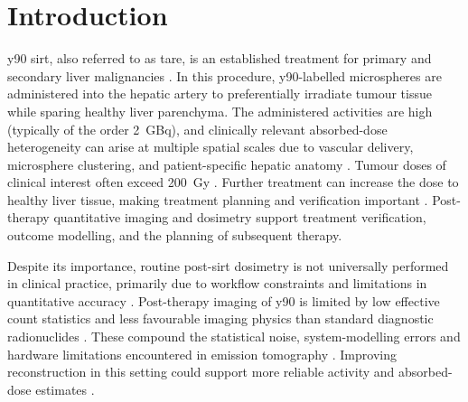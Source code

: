 \chapter{Introduction}
\label{ch:introduction}

\acrfull{y90} \acrfull{sirt}, also referred to as \acrfull{tare}, is an established treatment for primary and secondary liver malignancies \cite{sundramSelectiveInternalRadiation2017}. In this procedure, \gls{y90}-labelled microspheres are administered into the hepatic artery to preferentially irradiate tumour tissue while sparing healthy liver parenchyma. The administered activities are high (typically of the order \SI{2}{\giga\becquerel}), and clinically relevant absorbed-dose heterogeneity can arise at multiple spatial scales due to vascular delivery, microsphere clustering, and patient-specific hepatic anatomy \cite{strigariEvidenceBaseUse2014}. Tumour doses of clinical interest often exceed \SI{200}{\gray} \cite{salemClinicalDosimetricConsiderations2019}. Further treatment can increase the dose to healthy liver tissue, making treatment planning and verification important \cite{reinckeHepaticDecompensationTransarterial2022}. Post-therapy quantitative imaging and dosimetry support treatment verification, outcome modelling, and the planning of subsequent therapy.

Despite its importance, routine post-\gls{sirt} dosimetry is not universally performed in clinical practice, primarily due to workflow constraints and limitations in quantitative accuracy \cite{kappadathQuantitativeEvaluation90YPET2024, gearEANMEnablingGuide2023}. Post-therapy imaging of \gls{y90} is limited by low effective count statistics and less favourable imaging physics than standard diagnostic radionuclides \cite{kappadathQuantitativeEvaluation90YPET2024}. These compound the statistical noise, system-modelling errors and hardware limitations encountered in emission tomography \cite{baiTumorQuantificationClinical2013}. Improving reconstruction in this setting could support more reliable activity and absorbed-dose estimates \cite{davisPersonalisationMolecularRadiotherapy2020}.


